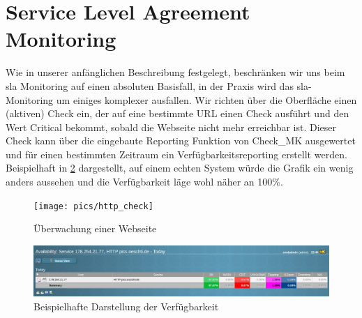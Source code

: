\documentclass[12pt,a4paper,parskip,listof=totoc,bibliography=totoc]{scrreprt}
\begin{document}
	\section{Service Level Agreement Monitoring}
	Wie in unserer anfänglichen Beschreibung festgelegt, beschränken wir uns beim \acrshort{sla} Monitoring auf einen absoluten Basisfall, in der Praxis wird das \acrshort{sla}-Monitoring um einiges komplexer ausfallen. Wir richten über die Oberfläche einen (aktiven) Check ein, der auf eine bestimmte URL einen Check ausführt und den Wert Critical bekommt, sobald die Webseite nicht mehr erreichbar ist. Dieser Check kann über die eingebaute Reporting Funktion von Check\_MK ausgewertet und für einen bestimmten Zeitraum ein Verfügbarkeitsreporting erstellt werden. Beispielhaft in \ref{fig:availability} dargestellt, auf einem echten System würde die Grafik ein wenig anders aussehen und die Verfügbarkeit läge wohl näher an 100\%.
	\begin{figure}[h!]
	\centering
	\texttt{[image: pics/http\_check]}
	\caption[Überwachung einer Webseite]{Überwachung einer Webseite}
	\label{fig:http_check}
	\end{figure}
	\begin{figure}[h!]
	\centering
	\includegraphics[width=1\linewidth]{pics/availability}
	\caption[Beispielhafte Darstellung der Verfügbarkeit]{Beispielhafte Darstellung der Verfügbarkeit}
	\label{fig:availability}
	\end{figure}


	
	
	\printbibliography 
	\printglossary[title=Abkürzungsverzeichnis, type=\acronymtype] %
	\listoffigures %
\end{document}

